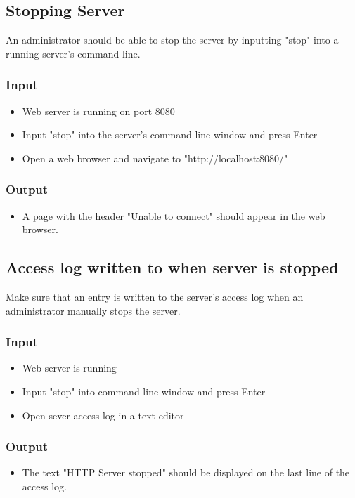 \documentclass[a4paper, 12pt]{article}
\begin{document}
\subsection{Stopping Server}

An administrator should be able to stop the server by inputting "stop" into a running server's command line.

\subsubsection{Input}
\begin{itemize}
\item Web server is running on port 8080
\item Input "stop" into the server's command line window and press Enter
\item Open a web browser and navigate to "http://localhost:8080/"
\end{itemize}

\subsubsection{Output}
\begin{itemize}
\item A page with the header "Unable to connect" should appear in the web browser.
\end{itemize}


\subsection{Access log written to when server is stopped}

Make sure that an entry is written to the server's access log when an administrator manually stops the server.

\subsubsection{Input}
\begin{itemize}
\item Web server is running
\item Input "stop" into command line window and press Enter
\item Open sever access log in a text editor
\end{itemize}

\subsubsection{Output}
\begin{itemize}
\item The text "HTTP Server stopped" should be displayed on the last line of the access log.
\end{itemize}
\end{document}
